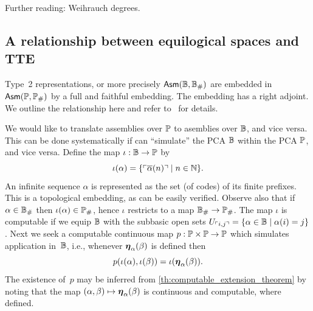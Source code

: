 Further reading: Weihrauch degrees.


\subsection{A relationship between equilogical spaces and TTE}
\label{sec:equ-tte}

Type~2 representations, or more precisely $\mathsf{Asm}(\mathbb{B},
  \mathbb{B}_{\#})$ are embedded in $\mathsf{Asm}(\mathbb{P}, \mathbb{P}_{\#})$ by a
full and faithful embedding. The embedding has a right adjoint. We
outline the relationship here and refer to~ for
details.

We would like to translate assemblies over $\mathbb{P}$ to asemblies over
$\mathbb{B}$, and vice versa. This can be done systematically if can
``simulate'' the PCA $\mathbb{B}$ within the PCA $\mathbb{P}$, and vice versa.
%
Define the map $\iota : \mathbb{B} \to \mathbb{P}$ by
\begin{equation*}
  \iota(\alpha) =
  \{ \ulcorner \overline{\alpha}(n) \urcorner \mid n \in \mathbb{N}\}.
\end{equation*}
An infinite sequence $\alpha$ is represented as the set (of codes) of
its finite prefixes. This is a topological embedding, as can be easily
verified. Observe also that if $\alpha \in \mathbb{B}_{\#}$ then
$\iota(\alpha) \in \mathbb{P}_{\#}$, hence $\iota$ restricts to a map
$\mathbb{B}_{\#} \to \mathbb{P}_{\#}$.
%
The map $\iota$ is computable if we equip $\mathbb{B}$ with the subbasic
open sets $U_{\ulcorner i,j \urcorner} = \{\alpha \in \mathbb{B} \mid \alpha(i) =
  j\}$. Next we seek a computable continuous map $p : \mathbb{P} \times
\mathbb{P} \to \mathbb{P}$ which simulates application in~$\mathbb{B}$, i.e.,
whenever $\text{\boldmath{$\eta$}}_{\alpha}(\beta)$ is defined then
%
\begin{equation*}
  p (\iota(\alpha), \iota(\beta)) = \iota(\text{\boldmath{$\eta$}}_{\alpha}(\beta)).
\end{equation*}
%
The existence of~$p$ may be inferred from \cref{th:computable_extension_theorem} by noting that the map
$(\alpha, \beta) \mapsto \text{\boldmath{$\eta$}}_{\alpha}(\beta)$ is continuous and
computable, where defined.

